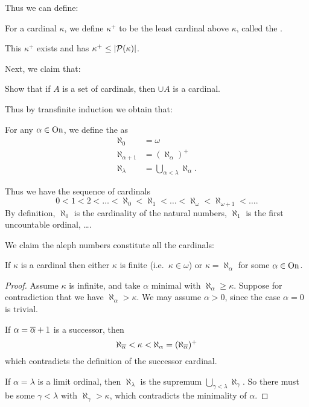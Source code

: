 Thus we can define:
\begin{definition}
	For a cardinal $\kappa$, we define $\kappa^+$ to be the least cardinal above $\kappa$,
	called the .
\end{definition}
This $\kappa^+$ exists and has $\kappa^+ \le \left\lvert \mathcal P(\kappa) \right\rvert$.

Next, we claim that:
\begin{exercise}
	Show that if $A$ is a set of cardinals, then $\cup A$ is a cardinal.
\end{exercise}

Thus by transfinite induction we obtain that:
\begin{definition}
	For any $\alpha \in \mathrm{On}$, we define the  as
	\begin{align*}
		\aleph_0 &= \omega \\
		\aleph_{\alpha+1} &= \left( \aleph_\alpha \right)^+ \\
		\aleph_{\lambda} &= \bigcup_{\alpha < \lambda} \aleph_\alpha.
	\end{align*}
\end{definition}

Thus we have the sequence of cardinals
\[
	0 < 1 < 2 < \dots < \aleph_0 < \aleph_1 < \dots < \aleph_\omega < \aleph_{\omega+1} < \dots.
\]
By definition, $\aleph_0$ is the cardinality of the natural numbers,
$\aleph_1$ is the first uncountable ordinal, \dots.

We claim the aleph numbers constitute all the cardinals:
\begin{lemma}
	If $\kappa$ is a cardinal then
	either $\kappa$ is finite (i.e.\ $\kappa \in \omega$) or
	$\kappa = \aleph_\alpha$ for some $\alpha \in \mathrm{On}$.
\end{lemma}
\begin{proof}
	Assume $\kappa$ is infinite, and take $\alpha$ minimal with $\aleph_\alpha \ge \kappa$.
	Suppose for contradiction that we have $\aleph_\alpha > \kappa$.
	We may assume $\alpha > 0$, since the case $\alpha = 0$ is trivial.

	If $\alpha = \overline\alpha + 1$ is a successor, then
	\[ \aleph_{\overline\alpha} < \kappa < \aleph_{\alpha}
		= (\aleph_{\overline\alpha})^+ \]
	which contradicts the definition of the successor cardinal.
	
	If $\alpha = \lambda$ is a limit ordinal, then $\aleph_\lambda$ is the
	supremum $\bigcup_{\gamma < \lambda} \aleph_\gamma$.
	So there must be some $\gamma < \lambda$ with $\aleph_\gamma > \kappa$,
	which contradicts the minimality of $\alpha$.
\end{proof}

